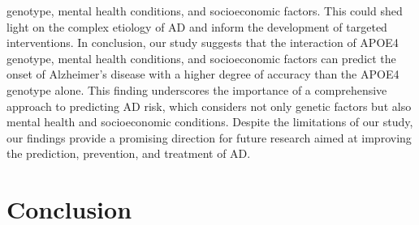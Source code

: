 \documentclass[conference]{IEEEtran}
\begin{document}
genotype, mental health conditions, and socioeconomic factors. This could shed light on the complex etiology of AD and inform the development of targeted interventions. In conclusion, our study suggests that the interaction of APOE4 genotype, mental health conditions, and socioeconomic factors can predict the onset of Alzheimer's disease with a higher degree of accuracy than the APOE4 genotype alone. This finding underscores the importance of a comprehensive approach to predicting AD risk, which considers not only genetic factors but also mental health and socioeconomic conditions. Despite the limitations of our study, our findings provide a promising direction for future research aimed at improving the prediction, prevention, and treatment of AD.

\section{Conclusion}
\end{document}

